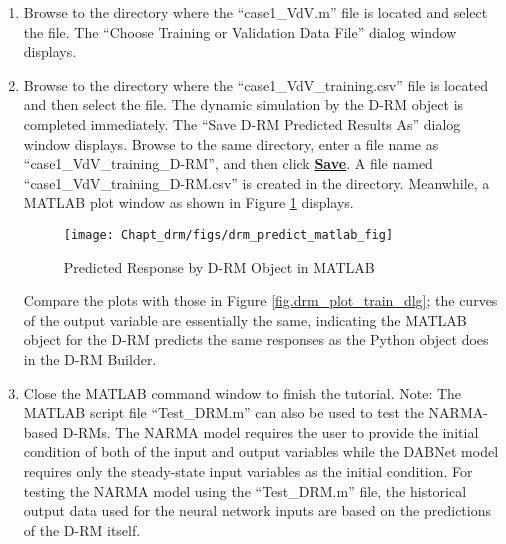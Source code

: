 \begin{enumerate}
	\item Browse to the directory where the ``case1\_VdV.m'' file is located and select the file.  The ``Choose Training or Validation Data File'' dialog window displays.
	\item Browse to the directory where the ``case1\_VdV\_training.csv'' file is located and then select the file.  The dynamic simulation by the D-RM object is completed immediately.  The ``Save D-RM Predicted Results As'' dialog window displays.  Browse to the same directory, enter a file name as ``case1\_VdV\_training\_D-RM'', and then click \textbf{\underline{Save}}.  A file named ``case1\_VdV\_training\_D-RM.csv'' is created in the directory.  Meanwhile, a MATLAB plot window as shown in Figure \ref{fig.drm_predict_matlab_fig} displays.
	\begin{figure}[H]
		\begin{center}
			\texttt{[image: Chapt\_drm/figs/drm\_predict\_matlab\_fig]}
			\caption{Predicted Response by D-RM Object in MATLAB}
			\label{fig.drm_predict_matlab_fig}
		\end{center}
	\end{figure}
	Compare the plots with those in Figure \ref{fig.drm_plot_train_dlg}; the curves of the output variable are essentially the same, indicating the MATLAB object for the D-RM predicts the same responses as the Python object does in the D-RM Builder.
	\item Close the MATLAB command window to finish the tutorial.  Note: The MATLAB script file ``Test\_DRM.m'' can also be used to test the NARMA-based D-RMs.  The NARMA model requires the user to provide the initial condition of both of the input and output variables while the DABNet model requires only the steady-state input variables as the initial condition.  For testing the NARMA model using the ``Test\_DRM.m'' file, the historical output data used for the neural network inputs are based on the predictions of the D-RM itself.
\end{enumerate}

